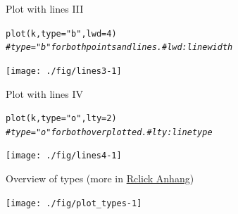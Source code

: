 \documentclass[xcolor=table,       handout,    xcolor=dvipsnames]{beamer}\usepackage[]{graphicx}\usepackage[]{color}
\makeatletter
\newcommand{\hlnum}[1]{\textcolor[rgb]{0,0,0}{#1}}
\newcommand{\hlstr}[1]{\textcolor[rgb]{0.545,0.137,0.137}{#1}}
\newcommand{\hlcom}[1]{\textcolor[rgb]{0,0.392,0}{\textit{#1}}}
\newcommand{\hlstd}[1]{\textcolor[rgb]{0,0,0}{#1}}
\newcommand{\hlkwc}[1]{\textcolor[rgb]{1,0,1}{#1}}
\newcommand{\hlkwd}[1]{\textcolor[rgb]{0,0,1}{#1}}
\newenvironment{kframe}{%
 \def\at@end@of@kframe{}%
 \ifinner\ifhmode%
  \def\at@end@of@kframe{\end{minipage}}%
  \begin{minipage}{\columnwidth}%
 \fi\fi%
 \def\FrameCommand##1{\hskip\@totalleftmargin \hskip-\fboxsep
 \colorbox{shadecolor}{##1}\hskip-\fboxsep
     \hskip-\linewidth \hskip-\@totalleftmargin \hskip\columnwidth}%
 \MakeFramed {\advance\hsize-\width
   \@totalleftmargin\z@ \linewidth\hsize
   \@setminipage}}%
 {\par\unskip\endMakeFramed%
 \at@end@of@kframe}
\newenvironment{knitrout}{}{} %
\makeatother
\begin{document}

\begin{frame}[fragile]{Plot with lines III}
\begin{knitrout}
\color{fgcolor}\begin{kframe}
\begin{alltt}
\hlkwd{plot}\hlstd{(k,} \hlkwc{type}\hlstd{=}\hlstr{"b"}\hlstd{,} \hlkwc{lwd}\hlstd{=}\hlnum{4}\hlstd{)}
\hlcom{# type="b" for both points and lines. # lwd: line width}
\end{alltt}
\end{kframe}

{\centering \texttt{[image: ./fig/lines3-1]} 

}



\end{knitrout}
\end{frame}


\begin{frame}[fragile]{Plot with lines IV}
\begin{knitrout}
\color{fgcolor}\begin{kframe}
\begin{alltt}
\hlkwd{plot}\hlstd{(k,} \hlkwc{type}\hlstd{=}\hlstr{"o"}\hlstd{,} \hlkwc{lty}\hlstd{=}\hlnum{2}\hlstd{)}
\hlcom{# type="o" for both overplotted. # lty: line type}
\end{alltt}
\end{kframe}

{\centering \texttt{[image: ./fig/lines4-1]} 

}



\end{knitrout}
\end{frame}


\begin{frame}[fragile]{Overview of types (more in \href{https://dl.dropboxusercontent.com/u/4836866/Rclick/Anhang.pdf}{Rclick Anhang})}
\begin{knitrout}
\color{fgcolor}

{\centering \texttt{[image: ./fig/plot\_types-1]} 

}



\end{knitrout}
\end{frame}
\end{document}
